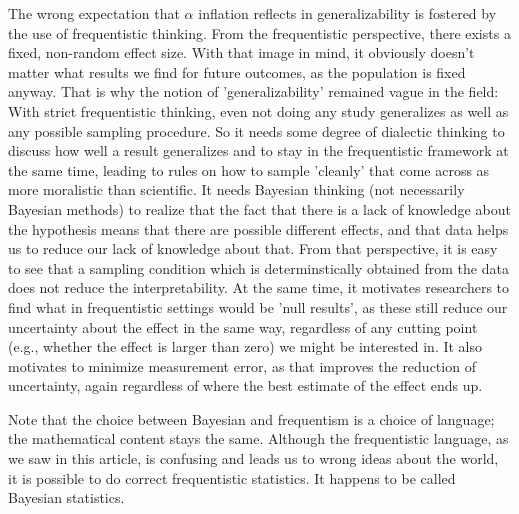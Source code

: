 \documentclass[man]{apa7}\usepackage[]{graphicx}\usepackage[]{xcolor}
\theoremstyle{definition}
\begin{document}
The wrong expectation that $\alpha$ inflation reflects in generalizability is fostered by the use of frequentistic thinking. From the frequentistic perspective, there exists a fixed, non-random effect size. With that image in mind, it obviously doesn't matter what results we find for future outcomes, as the population is fixed anyway. That is why the notion of 'generalizability' remained vague in the field: With strict frequentistic thinking, even not doing any study generalizes as well as any possible sampling procedure. So it needs some degree of dialectic thinking to discuss how well a result generalizes and to stay in the frequentistic framework at the same time, leading to rules on how to sample 'cleanly' that come across as more moralistic than scientific. It needs Bayesian thinking (not necessarily Bayesian methods) to realize that the fact that there is a lack of knowledge about the hypothesis means that there are possible different effects, and that data helps us to reduce our lack of knowledge about that. From that perspective, it is easy to see that a sampling condition which is determinstically obtained from the data does not reduce the interpretability. At the same time, it motivates researchers to find what in frequentistic settings would be 'null results', as these still reduce our uncertainty about the effect in the same way, regardless of any cutting point (e.g., whether the effect is larger than zero) we might be interested in. It also motivates to minimize measurement error, as that improves the reduction of uncertainty, again regardless of where the best estimate of the effect ends up. 

Note that the choice between Bayesian and frequentism is a choice of language; the mathematical content stays the same. Although the frequentistic language, as we saw in this article, is confusing and leads us to wrong ideas about the world, it is possible to do correct frequentistic statistics. It happens to be called Bayesian statistics.

\printbibliography
\end{document}
